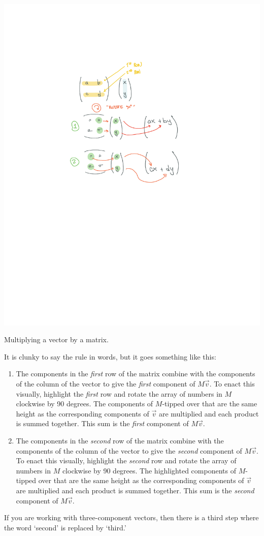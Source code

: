 \documentclass[12pt, oneside]{report}    %
\begin{document}
\begin{marginfigure}%
    \includegraphics[width=\textwidth]{figures/MatrixMult_2220.pdf}
    \caption{Multiplying a vector by a matrix.}
    \label{fig:matrix:mult:2220}
\end{marginfigure}
It is clunky to say the rule in words, but it goes something like this: 
\begin{enumerate}
    \item The components in the \emph{first} row of the matrix combine with the components of the column of the vector to give the \emph{first} component of $M\vec{v}$. To enact this visually,  highlight the \emph{first} row and rotate the array of numbers in $M$ clockwise by 90 degrees. The components of $M$-tipped over that are the same height as the corresponding components of $\vec{v}$ are multiplied and each product is summed together. This sum is the \emph{first} component of $M\vec{v}$.
    \item The components in the \emph{second} row of the matrix combine with the components of the column of the vector to give the \emph{second} component of $M\vec{v}$. To enact this visually,  highlight the \emph{second} row and rotate the array of numbers in $M$ clockwise by 90 degrees. The highlighted components of $M$-tipped over that are the same height as the corresponding components of $\vec{v}$ are multiplied and each product is summed together. This sum is the \emph{second} component of $M\vec{v}$.
\end{enumerate}
If you are working with three-component vectors, then there is a third step where the word `second' is replaced by `third.' 
\end{document}
